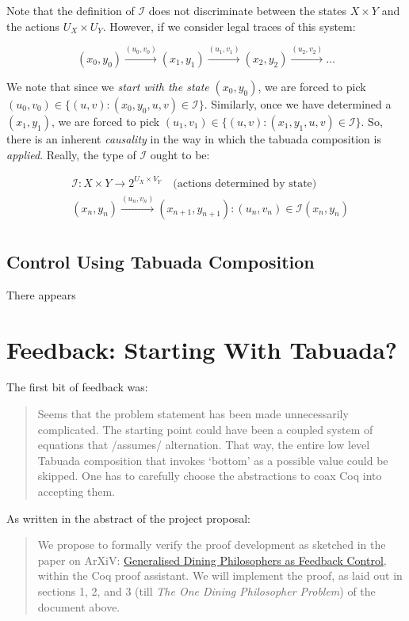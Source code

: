 \documentclass{article}
\begin{document}
Note that the definition of $\mathcal I$ does not discriminate between the
states $X \times Y$ and the actions $U_X \times U_Y$. However, if we consider
legal traces of this system:

$$
(x_0, y_0) \xrightarrow{(u_0, v_0)} (x_1, y_1) \xrightarrow{(u_1, v_1)} (x_2, y_2) \xrightarrow{(u_2, v_2)} \dots
$$

We note that since we \emph{start with the state} $(x_0, y_0)$, we are forced
to pick $(u_0, v_0) \in \{ (u, v) : (x_0, y_0, u, v) \in \mathcal I \}$. Similarly,
once we have determined a $(x_1, y_1)$, we are forced to pick $(u_1, v_1) \in \{ (u, v): (x_1, y_1, u, v) \in \mathcal I\}$. So,
there is an inherent  \emph{causality} in the way in which the tabuada
composition is \emph{applied}. Really, the type of $\mathcal I$ ought to be:

\begin{align*}
&\mathcal I: X \times Y \rightarrow 2^{U_X \times V_Y} \quad \text{(actions determined by state)}\\
&(x_n, y_n) \xrightarrow{(u_n, v_n)} (x_{n+1}, y_{n+1}) :  (u_n, v_n) \in \mathcal I(x_n, y_n)  \\
\end{align*}



\subsection{Control Using Tabuada Composition}

There appears 

\section{Feedback: Starting With Tabuada?}
The first bit of feedback was:
\begin{quote}
Seems that the problem statement has been
made unnecessarily complicated.  The starting
point could have been a coupled system of
equations that /assumes/ alternation.  That
way, the entire low level Tabuada composition
that invokes `bottom' as a possible value
could be skipped.  One has to carefully
choose the abstractions to coax Coq into
accepting them.
\end{quote}

As written in the abstract of the project proposal:

\begin{quote}
We propose to formally verify the proof development as sketched in the
paper on ArXiV: \href{https://arxiv.org/pdf/1805.02010.pdf}{Generalised Dining Philosophers as Feedback Control},
within the Coq proof assistant.
We will implement the proof, as laid out in sections
1, 2, and 3 (till \emph{The One Dining Philosopher Problem}) of the document
above.
\end{quote}
\end{document}
